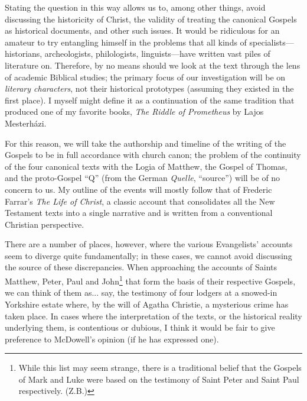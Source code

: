 Stating the question in this way allows us to, among other things, avoid discussing the historicity of Christ, the validity of treating the canonical Gospels as historical documents, and other such issues. It would be ridiculous for an amateur to try entangling himself in the problems that all kinds of specialists---historians, archeologists, philologists, linguists---have written vast piles of literature on. Therefore, by no means should we look at the text through the lens of academic Biblical studies; the primary focus of our investigation will be on \emph{literary characters}, not their historical prototypes (assuming they existed in the first place). I myself might define it as a continuation of the same tradition that produced one of my favorite books, \emph{The Riddle of Prometheus} by Lajos Mesterházi.

For this reason, we will take the authorship and timeline of the writing of the Gospels to be in full accordance with church canon; the problem of the continuity of the four canonical texts with the Logia of Matthew, the Gospel of Thomas, and the proto-Gospel ``Q'' (from the German \emph{Quelle}, ``source'') will be of no concern to us. My outline of the events will mostly follow that of Frederic Farrar's \emph{The Life of Christ}, a classic account that consolidates all the New Testament texts into a single narrative and is written from a conventional Christian perspective.

There are a number of places, however, where the various Evangelists' accounts seem to diverge quite fundamentally; in these cases, we cannot avoid discussing the source of these discrepancies. When approaching the accounts of Saints Matthew, Peter, Paul and John\footnote{While this list may seem strange, there is a traditional belief that the Gospels of Mark and Luke were based on the testimony of Saint Peter and Saint Paul respectively. (Z.B.)} that form the basis of their respective Gospels, we can think of them as... say, the testimony of four lodgers at a snowed-in Yorkshire estate where, by the will of Agatha Christie, a mysterious crime has taken place. In cases where the interpretation of the texts, or the historical reality underlying them, is contentious or dubious, I think it would be fair to give preference to McDowell's opinion (if he has expressed one).

